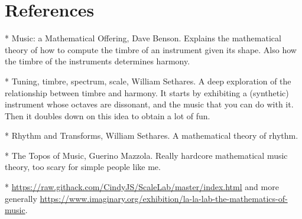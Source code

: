 \section*{References}

* Music: a Mathematical Offering, Dave Benson. Explains the mathematical
theory of how to compute the timbre of an instrument given its shape. Also
how the timbre of the instruments determines harmony.

* Tuning, timbre, spectrum, scale, William Sethares. A deep exploration of
the relationship between timbre and harmony. It starts by exhibiting a
(synthetic) instrument whose octaves are dissonant, and the music that you
can do with it. Then it doubles down on this idea to obtain a lot of fun.

* Rhythm and Transforms, William Sethares. A mathematical theory of rhythm.

* The Topos of Music, Guerino Mazzola. Really hardcore mathematical music
theory, too scary for simple people like me.

* \url{https://raw.githack.com/CindyJS/ScaleLab/master/index.html} and more
generally
\url{https://www.imaginary.org/exhibition/la-la-lab-the-mathematics-of-music}.


